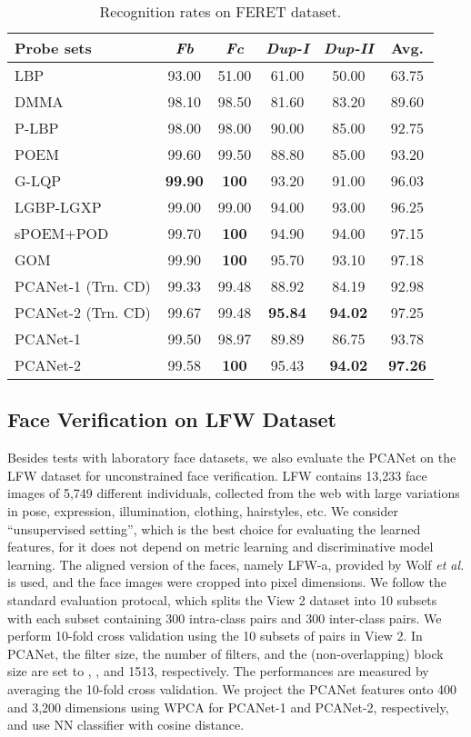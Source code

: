\documentclass[10pt,journal,compsoc]{IEEEtran}
\begin{document}
\begin{table}\centering
\caption{Recognition rates  on FERET dataset.}
\begin{tabular}{l|c|c|c|c||c}
  \hline
Probe sets & {\it Fb} & {\it Fc}  & {\it Dup-I}  &  {\it Dup-II} & {\rm Avg.} \\ \hline \hline
  LBP \cite{Ahonen2006} & 93.00 & 51.00 & 61.00 & 50.00 & 63.75\\
  DMMA \cite{Lu2013}  & 98.10 & 98.50 & 81.60 & 83.20 & 89.60 \\
  P-LBP \cite{Tan2010}    & 98.00 & 98.00 & 90.00 & 85.00 & 92.75 \\
  POEM \cite{Vu2012}    & 99.60 & 99.50 & 88.80 & 85.00 & 93.20 \\
  G-LQP \cite{Hussain2012} & {\bf 99.90} & {\bf  100} & 93.20 & 91.00 & 96.03 \\
  LGBP-LGXP \cite{Xie2010} & 99.00 & 99.00 & 94.00 & 93.00 & 96.25 \\
  sPOEM+POD \cite{Vu2013}   &99.70  & {\bf 100} & 94.90   & 94.00 & 97.15  \\
  GOM \cite{Chai2014} & 99.90 & {\bf 100} &  95.70  & 93.10 & 97.18 \\ \hline
  PCANet-1 (Trn. CD) & 99.33  &  99.48  &  88.92  &  84.19 & 92.98 \\
  PCANet-2 (Trn. CD) &  99.67  &  99.48  & {\bf  95.84}  &  {\bf 94.02} & 97.25 \\
PCANet-1   & 99.50  &  98.97 &   89.89  &  86.75 &  93.78 \\
  PCANet-2   & 99.58 & {\bf 100}    &  95.43 & {\bf  94.02} & {\bf 97.26}  \\
  \hline
\end{tabular}\label{tab: FERET_dataset}
\end{table}


\subsection{Face Verification on LFW Dataset}
Besides tests with laboratory face datasets, we also evaluate the PCANet on the LFW dataset \cite{Huang2007} for unconstrained face verification. LFW contains 13,233 face images of 5,749 different individuals, collected from the web with large variations in pose, expression, illumination, clothing, hairstyles, etc. We consider ``unsupervised setting'', which is the best choice for evaluating the learned features, for it does not depend on metric learning and discriminative model learning. The aligned version of the faces, namely LFW-a, provided by Wolf {\it et al.} \cite{Wolf2011} is used, and the face images were cropped into  pixel dimensions. We follow the standard evaluation protocal, which splits the View 2 dataset into 10 subsets with each subset containing 300 intra-class pairs and 300 inter-class pairs. We perform 10-fold cross validation using the 10 subsets of pairs in View 2. In PCANet, the filter size, the number of filters, and the (non-overlapping) block size are set to , , and 1513, respectively. The performances are measured by averaging the 10-fold cross validation. We project the PCANet features onto 400 and 3,200 dimensions using WPCA for PCANet-1 and PCANet-2, respectively, and use NN classifier with cosine distance.
\end{document}
